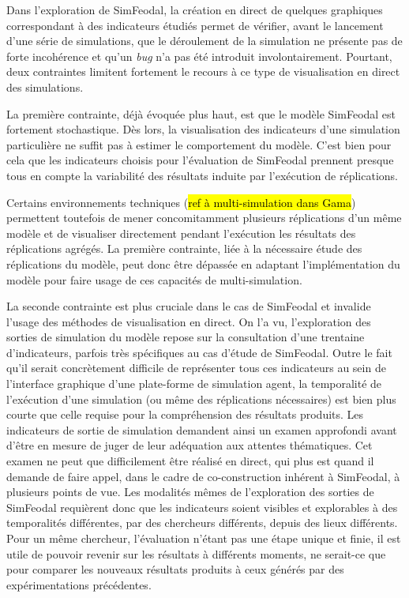 	Dans l'exploration de SimFeodal, la création en direct de quelques graphiques correspondant à des indicateurs étudiés permet de vérifier, avant le lancement d'une série de simulations, que le déroulement de la simulation ne présente pas de forte incohérence et qu'un \textit{bug} n'a pas été introduit involontairement.
	Pourtant, deux contraintes limitent fortement le recours à ce type de visualisation en direct des simulations.

	La première contrainte, déjà évoquée plus haut, est que le modèle SimFeodal est fortement stochastique.
	Dès lors, la visualisation des indicateurs d'une simulation particulière ne suffit pas à estimer le comportement du modèle.
	C'est bien pour cela que les indicateurs choisis pour l'évaluation de SimFeodal prennent presque tous en compte la variabilité des résultats induite par l'exécution de réplications.

	Certains environnements techniques (\hl{ref à multi-simulation dans Gama}) permettent toutefois de mener concomitamment plusieurs réplications d'un même modèle et de visualiser directement pendant l'exécution les résultats des réplications agrégés.
	La première contrainte, liée à la nécessaire étude des réplications du modèle, peut donc être dépassée en adaptant l'implémentation du modèle pour faire usage de ces capacités de multi-simulation.

	La seconde contrainte est plus cruciale dans le cas de SimFeodal et invalide l'usage des méthodes de visualisation en direct.
	On l'a vu, l'exploration des sorties de simulation du modèle repose sur la consultation d'une trentaine d'indicateurs, parfois très spécifiques au cas d'étude de SimFeodal.
	Outre le fait qu'il serait concrètement difficile de représenter tous ces indicateurs au sein de l'interface graphique d'une plate-forme de simulation agent, la temporalité de l'exécution d'une simulation (ou même des réplications nécessaires) est bien plus courte que celle requise pour la compréhension des résultats produits.
	Les indicateurs de sortie de simulation demandent ainsi un examen approfondi avant d'être en mesure de juger de leur adéquation aux attentes thématiques.
	Cet examen ne peut que difficilement être réalisé en direct, qui plus est quand il demande de faire appel, dans le cadre de co-construction inhérent à SimFeodal, à plusieurs points de vue.
	Les modalités mêmes de l'exploration des sorties de SimFeodal requièrent donc que les indicateurs soient visibles et explorables à des temporalités différentes, par des chercheurs différents, depuis des lieux différents.
	Pour un même chercheur, l'évaluation n'étant pas une étape unique et finie, il est utile de pouvoir revenir sur les résultats à différents moments, ne serait-ce que pour comparer les nouveaux résultats produits à ceux générés par des expérimentations précédentes.

